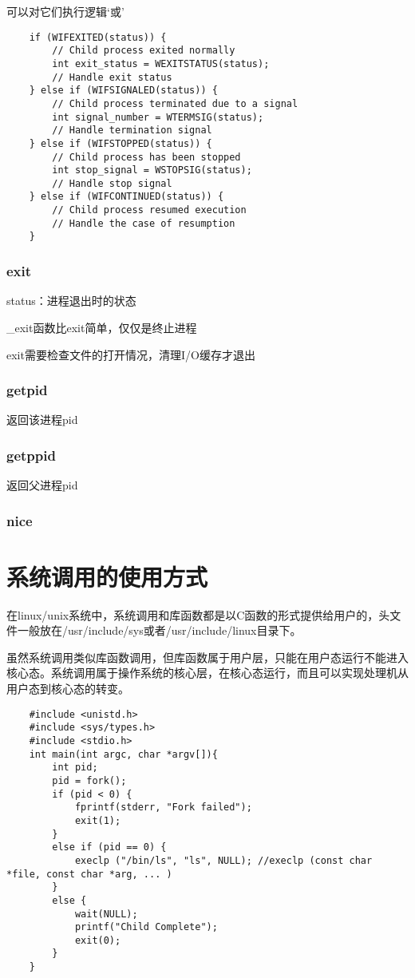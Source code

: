 \documentclass{ctexart}
\begin{document}
可以对它们执行逻辑‘或’

\begin{lstlisting}
    if (WIFEXITED(status)) {
        // Child process exited normally
        int exit_status = WEXITSTATUS(status);
        // Handle exit status
    } else if (WIFSIGNALED(status)) {
        // Child process terminated due to a signal
        int signal_number = WTERMSIG(status);
        // Handle termination signal
    } else if (WIFSTOPPED(status)) {
        // Child process has been stopped
        int stop_signal = WSTOPSIG(status);
        // Handle stop signal
    } else if (WIFCONTINUED(status)) {
        // Child process resumed execution
        // Handle the case of resumption
    }
\end{lstlisting}

\subsubsection{exit}
status：进程退出时的状态

\_exit函数比exit简单，仅仅是终止进程

exit需要检查文件的打开情况，清理I/O缓存才退出
\subsubsection{getpid}
返回该进程pid
\subsubsection{getppid}
返回父进程pid
\subsubsection{nice}

\section{系统调用的使用方式}
在linux/unix系统中，系统调用和库函数都是以C函数的形式提供给用户的，头文件一般放在/usr/include/sys或者/usr/include/linux目录下。

虽然系统调用类似库函数调用，但库函数属于用户层，只能在用户态运行不能进入核心态。系统调用属于操作系统的核心层，在核心态运行，而且可以实现处理机从用户态到核心态的转变。

\begin{lstlisting}
    #include <unistd.h>
    #include <sys/types.h>
    #include <stdio.h>
    int main(int argc, char *argv[]){
        int pid;
        pid = fork();
        if (pid < 0) {
            fprintf(stderr, "Fork failed");
            exit(1);
        }
        else if (pid == 0) {
            execlp ("/bin/ls", "ls", NULL); //execlp (const char *file, const char *arg, ... )
        }
        else {
            wait(NULL);
            printf("Child Complete");
            exit(0);
        }
    }
\end{lstlisting}
\end{document}

